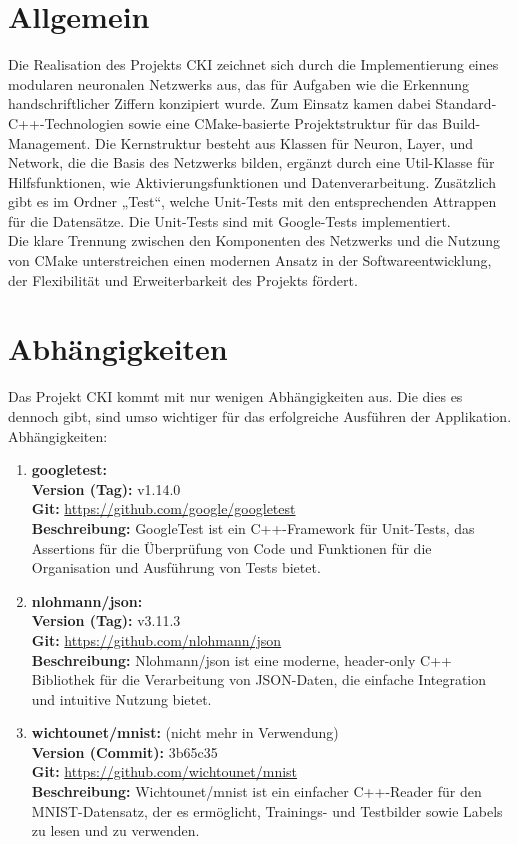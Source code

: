 \section{Allgemein}
\label{sec:RealAllgemein}
Die Realisation des Projekts CKI zeichnet sich durch die Implementierung eines modularen neuronalen Netzwerks aus, das für Aufgaben wie die Erkennung handschriftlicher Ziffern konzipiert wurde. Zum Einsatz kamen dabei Standard-C++-Technologien sowie eine CMake-basierte Projektstruktur für das Build-Management. Die Kernstruktur besteht aus Klassen für Neuron, Layer, und Network, die die Basis des Netzwerks bilden, ergänzt durch eine Util-Klasse für Hilfsfunktionen, wie Aktivierungsfunktionen und Datenverarbeitung.
Zusätzlich gibt es im Ordner „Test“, welche Unit-Tests mit den entsprechenden Attrappen für die Datensätze. Die Unit-Tests sind mit Google-Tests implementiert.
\\
Die klare Trennung zwischen den Komponenten des Netzwerks und die Nutzung von CMake unterstreichen einen modernen Ansatz in der Softwareentwicklung, der Flexibilität und Erweiterbarkeit des Projekts fördert. 

\section{Abhängigkeiten}
\label{sec:RealAbhängigkeiten}
Das Projekt CKI kommt mit nur wenigen Abhängigkeiten aus.
Die dies es dennoch gibt, sind umso wichtiger für das erfolgreiche Ausführen der Applikation.
\\
Abhängigkeiten:
\begin{enumerate}
	\item \textbf{googletest:} \\
	\textbf{Version (Tag):} v1.14.0 \\
	\textbf{Git:} \url{https://github.com/google/googletest} \\
	\textbf{Beschreibung:} GoogleTest ist ein C++-Framework für Unit-Tests, das Assertions für die Überprüfung von Code und Funktionen für die Organisation und Ausführung von Tests bietet.
	\item \textbf{nlohmann/json:} \\
	\textbf{Version (Tag):} v3.11.3 \\
	\textbf{Git:} \url{https://github.com/nlohmann/json} \\
	\textbf{Beschreibung:} Nlohmann/json ist eine moderne, header-only C++ Bibliothek für die Verarbeitung von JSON-Daten, die einfache Integration und intuitive Nutzung bietet.
	\item \textbf{wichtounet/mnist:} (nicht mehr in Verwendung)\\
	\textbf{Version (Commit):} 3b65c35 \\
	\textbf{Git:} \url{https://github.com/wichtounet/mnist} \\
	\textbf{Beschreibung:} Wichtounet/mnist ist ein einfacher C++-Reader für den MNIST-Datensatz, der es ermöglicht, Trainings- und Testbilder sowie Labels zu lesen und zu verwenden.
\end{enumerate}

